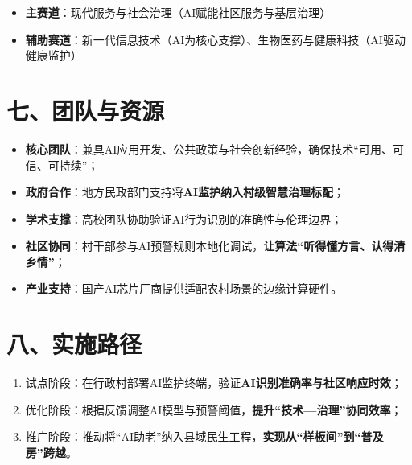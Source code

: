 \documentclass[
  letterpaper,
  DIV=11,
  numbers=noendperiod]{scrreprt}
\providecommand{\tightlist}{%
  \setlength{\itemsep}{0pt}\setlength{\parskip}{0pt}}
\begin{document}
\begin{itemize}
\tightlist
\item
  \textbf{主赛道}：现代服务与社会治理（AI赋能社区服务与基层治理）\\
\item
  \textbf{辅助赛道}：新一代信息技术（AI为核心支撑）、生物医药与健康科技（AI驱动健康监护）
\end{itemize}

\section{七、团队与资源}\label{ux4e03ux56e2ux961fux4e0eux8d44ux6e90}

\begin{itemize}
\tightlist
\item
  \textbf{核心团队}：兼具AI应用开发、公共政策与社会创新经验，确保技术``可用、可信、可持续''；\\
\item
  \textbf{政府合作}：地方民政部门支持将\textbf{AI监护纳入村级智慧治理标配}；\\
\item
  \textbf{学术支撑}：高校团队协助验证AI行为识别的准确性与伦理边界；\\
\item
  \textbf{社区协同}：村干部参与AI预警规则本地化调试，\textbf{让算法``听得懂方言、认得清乡情''}；\\
\item
  \textbf{产业支持}：国产AI芯片厂商提供适配农村场景的边缘计算硬件。
\end{itemize}

\section{八、实施路径}\label{ux516bux5b9eux65bdux8defux5f84}

\begin{enumerate}
\def\labelenumi{\arabic{enumi}.}
\tightlist
\item
  试点阶段：在行政村部署AI监护终端，验证\textbf{AI识别准确率与社区响应时效}；\\
\item
  优化阶段：根据反馈调整AI模型与预警阈值，\textbf{提升``技术---治理''协同效率}；\\
\item
  推广阶段：推动将``AI助老''纳入县域民生工程，\textbf{实现从``样板间''到``普及房''跨越}。
\end{enumerate}
\end{document}
